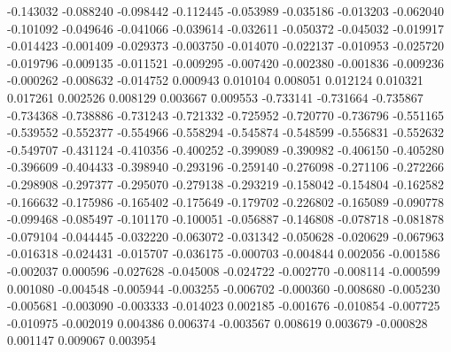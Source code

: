 -0.143032
-0.088240
-0.098442
-0.112445
-0.053989
-0.035186
-0.013203
-0.062040
-0.101092
-0.049646
-0.041066
-0.039614
-0.032611
-0.050372
-0.045032
-0.019917
-0.014423
-0.001409
-0.029373
-0.003750
-0.014070
-0.022137
-0.010953
-0.025720
-0.019796
-0.009135
-0.011521
-0.009295
-0.007420
-0.002380
-0.001836
-0.009236
-0.000262
-0.008632
-0.014752
0.000943
0.010104
0.008051
0.012124
0.010321
0.017261
0.002526
0.008129
0.003667
0.009553
-0.733141
-0.731664
-0.735867
-0.734368
-0.738886
-0.731243
-0.721332
-0.725952
-0.720770
-0.736796
-0.551165
-0.539552
-0.552377
-0.554966
-0.558294
-0.545874
-0.548599
-0.556831
-0.552632
-0.549707
-0.431124
-0.410356
-0.400252
-0.399089
-0.390982
-0.406150
-0.405280
-0.396609
-0.404433
-0.398940
-0.293196
-0.259140
-0.276098
-0.271106
-0.272266
-0.298908
-0.297377
-0.295070
-0.279138
-0.293219
-0.158042
-0.154804
-0.162582
-0.166632
-0.175986
-0.165402
-0.175649
-0.179702
-0.226802
-0.165089
-0.090778
-0.099468
-0.085497
-0.101170
-0.100051
-0.056887
-0.146808
-0.078718
-0.081878
-0.079104
-0.044445
-0.032220
-0.063072
-0.031342
-0.050628
-0.020629
-0.067963
-0.016318
-0.024431
-0.015707
-0.036175
-0.000703
-0.004844
0.002056
-0.001586
-0.002037
0.000596
-0.027628
-0.045008
-0.024722
-0.002770
-0.008114
-0.000599
0.001080
-0.004548
-0.005944
-0.003255
-0.006702
-0.000360
-0.008680
-0.005230
-0.005681
-0.003090
-0.003333
-0.014023
0.002185
-0.001676
-0.010854
-0.007725
-0.010975
-0.002019
0.004386
0.006374
-0.003567
0.008619
0.003679
-0.000828
0.001147
0.009067
0.003954
